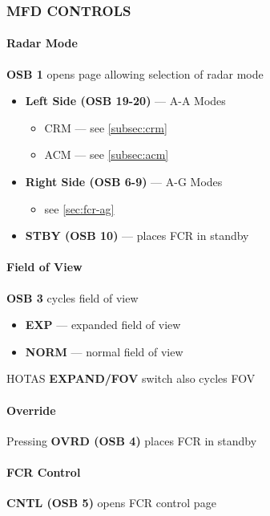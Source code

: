 \clearpage

\subsubsection{MFD CONTROLS}

\paragraph{Radar Mode}
\textbf{OSB 1} opens page allowing selection of radar mode
\begin{itemize}
    \item \textbf{Left Side (OSB 19-20)} --- A-A Modes
    \begin{itemize}
        \item CRM --- see \cref{subsec:crm}
        \item ACM --- see \cref{subsec:acm}
    \end{itemize}
    \item \textbf{Right Side (OSB 6-9)} --- A-G Modes
    \begin{itemize}
        \item see \cref{sec:fcr-ag}
    \end{itemize}
    \item \textbf{STBY (OSB 10)} --- places FCR in standby
\end{itemize}

\paragraph{Field of View}
\textbf{OSB 3} cycles field of view

\begin{itemize}
    \item \textbf{EXP} --- expanded field of view
    \item \textbf{NORM} --- normal field of view
\end{itemize}

HOTAS \textbf{EXPAND/FOV} switch also cycles FOV

\paragraph{Override} 
Pressing \textbf{OVRD (OSB 4)}  places FCR in standby

\paragraph{FCR Control} 
\textbf{CNTL (OSB 5)} opens FCR control page

